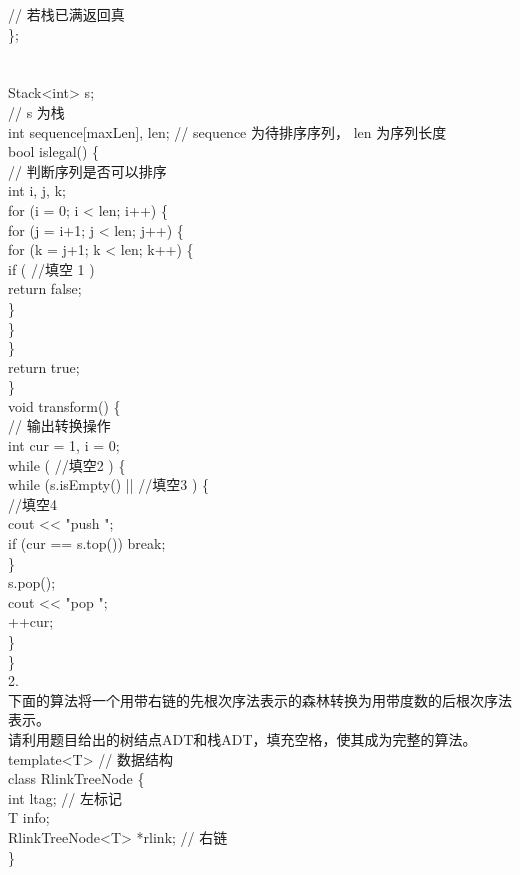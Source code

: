 \begin{question}
// 若栈已满返回真\\
\};\\
\\
\\
Stack<int> s;\\
//  s 为栈\\
int sequence[maxLen],  len;                 // sequence 为待排序序列， len 为序列长度\\
bool islegal()  \{\\
// 判断序列是否可以排序\\
int i, j, k;\\
for (i = 0; i < len; i++) \{\\
for (j = i+1; j < len; j++) \{\\
for (k = j+1; k < len; k++) \{\\
if (  //填空 1   )\\
return false;\\
\}\\
\}\\
\}\\
return true;\\
\}\\
void transform()  \{\\
// 输出转换操作\\
int cur = 1,  i = 0;\\
while  (  //填空2  ) \{\\
while (s.isEmpty()  ||  //填空3 ) \{\\
//填空4\\
cout << "push ";\\
if (cur == s.top()) break;\\
\}\\
s.pop();\\
cout << "pop ";\\
++cur;\\
\}\\
\}\\
2.\\
下面的算法将一个用带右链的先根次序法表示的森林转换为用带度数的后根次序法表示。\\
请利用题目给出的树结点ADT和栈ADT，填充空格，使其成为完整的算法。\\
template<T>      // 数据结构\\
class RlinkTreeNode \{\\
int ltag;                // 左标记\\
T info;\\
RlinkTreeNode<T> *rlink; // 右链\\
\}\\

\end{question}
